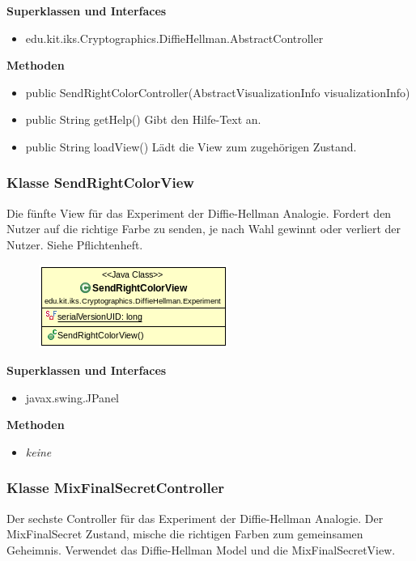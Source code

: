 \documentclass{article}
\begin{document}
      \textbf{Superklassen und Interfaces}
      \begin{itemize}
        \item edu.kit.iks.Cryptographics.DiffieHellman.AbstractController
      \end{itemize}

      \textbf{Methoden}
      \begin{itemize}
          \item public SendRightColorController(AbstractVisualizationInfo visualizationInfo)
        \item public String getHelp() \newline
        Gibt den Hilfe-Text an.
        \item public String loadView() \newline
        Lädt die View zum zugehörigen Zustand.
      \end{itemize}

\subsubsection{Klasse SendRightColorView}
      Die fünfte View für das Experiment der Diffie-Hellman Analogie.
      Fordert den Nutzer auf die richtige Farbe zu senden,
      je nach Wahl gewinnt oder verliert der Nutzer. Siehe Pflichtenheft.

      \begin{figure}[H]
        \centering
        \includegraphics{resources/edu-kit-iks-Cryptographics-DiffieHellman-Experiment-SendRightColorView}
      \end{figure}

      \textbf{Superklassen und Interfaces}
      \begin{itemize}
        \item javax.swing.JPanel
      \end{itemize}

      \textbf{Methoden}
      \begin{itemize}
        \item \textit{keine}
      \end{itemize}

\subsubsection{Klasse MixFinalSecretController}
      Der sechste Controller für das Experiment der Diffie-Hellman Analogie.
      Der MixFinalSecret Zustand, mische die richtigen Farben
      zum gemeinsamen Geheimnis.
      Verwendet das Diffie-Hellman Model und die MixFinalSecretView.
\end{document}
